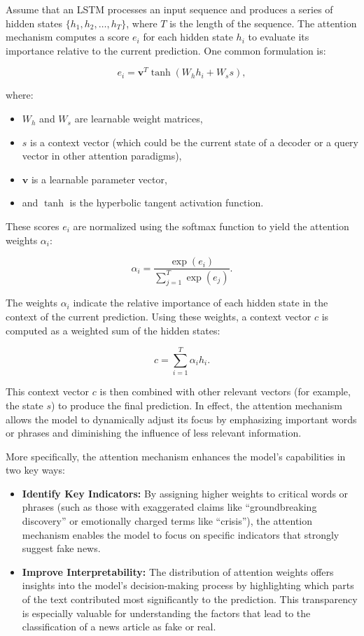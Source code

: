 \documentclass[sn-mathphys-ay, Numbered]{sn-jnl}
\theoremstyle{thmstyleone}%
\theoremstyle{thmstyletwo}%
\theoremstyle{thmstylethree}%
\begin{document}
Assume that an LSTM processes an input sequence and produces a series of hidden states \(\{h_1, h_2, \ldots, h_T\}\), where \(T\) is the length of the sequence. The attention mechanism computes a score \(e_i\) for each hidden state \(h_i\) to evaluate its importance relative to the current prediction. 
\clearpage
One common formulation is:

\[
e_i = \mathbf{v}^T \tanh(W_h h_i + W_s s),
\]

where:
\begin{itemize}
    \item \(W_h\) and \(W_s\) are learnable weight matrices,
    \item \(s\) is a context vector (which could be the current state of a decoder or a query vector in other attention paradigms),
    \item \(\mathbf{v}\) is a learnable parameter vector,
    \item and \(\tanh\) is the hyperbolic tangent activation function.
\end{itemize}

These scores \(e_i\) are normalized using the softmax function to yield the attention weights \(\alpha_i\):

\[
\alpha_i = \frac{\exp(e_i)}{\sum_{j=1}^{T} \exp(e_j)}.
\]

The weights \(\alpha_i\) indicate the relative importance of each hidden state in the context of the current prediction. Using these weights, a context vector \(c\) is computed as a weighted sum of the hidden states:

\[
c = \sum_{i=1}^{T} \alpha_i h_i.
\]

This context vector \(c\) is then combined with other relevant vectors (for example, the state \(s\)) to produce the final prediction. In effect, the attention mechanism allows the model to dynamically adjust its focus by emphasizing important words or phrases and diminishing the influence of less relevant information.

More specifically, the attention mechanism enhances the model's capabilities in two key ways:

\begin{itemize}
    \item \textbf{Identify Key Indicators:} By assigning higher weights to critical words or phrases (such as those with exaggerated claims like ``groundbreaking discovery'' or emotionally charged terms like ``crisis''), the attention mechanism enables the model to focus on specific indicators that strongly suggest fake news.
    
    \item \textbf{Improve Interpretability:} The distribution of attention weights offers insights into the model's decision-making process by highlighting which parts of the text contributed most significantly to the prediction. This transparency is especially valuable for understanding the factors that lead to the classification of a news article as fake or real.
\end{itemize}
\end{document}
